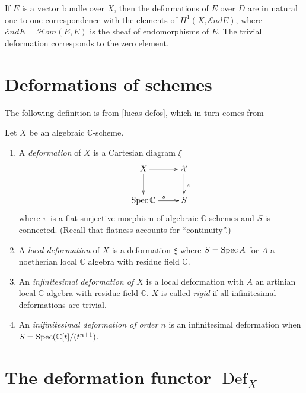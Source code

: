 \begin{lemma}[Corollary]
\label{lemma-vector-bundle-first-order}
If $E$ is a vector bundle over $X$, then the
deformations of $E$ over $D$ are in natural
one-to-one correspondence with the elements
of $H^1(X,\mathcal{E}nd E)$, where
$\mathcal{E}nd E=\mathcal{H}om(E,E)$ is the
sheaf of endomorphisms of $E$. The trivial
deformation corresponds to the zero element.
\end{lemma}



\section{Deformations of schemes}
\label{section-deformations-of-schemes}

\noindent
The following definition is from
[lucas-defos], which in turn comes from
\cite{Sernesi-deformations}

\begin{definition}
\label{definition-deformation}
Let $X$ be an algebraic $\mathbb{C}$-scheme.
\begin{enumerate}
\item A {\it deformation} of $X$ is a
Cartesian diagram $\xi$
$$
\xymatrix{
X\ar[r]\ar[d]&\mathcal{X}\ar[d]^{\pi}\\
\Spec \mathbb{C}\ar[r]^s&S
}
$$
where $\pi$ is a flat surjective morphism of
algebraic $\mathbb{C}$-schemes and
$S$ is connected. (Recall that flatness
accounts for ``continuity''.)
\item A {\it local deformation} of $X$ is a
deformation $\xi$ where
$S=\mathop{\mathrm{Spec}} A$ for $A$ a noetherian local
$\mathbb{C}$ algebra with residue
field $\mathbb{C}$.
\item An {\it infinitesimal deformation of
$X$} is a local deformation with $A$
an artinian local $\mathbb{C}$-algebra with
residue field $\mathbb{C}$. $X$ is
called {\it rigid} if all infinitesimal
deformations are trivial.
\item An {\it inifinitesimal deformation of
order $n$} is an infinitesimal
deformation when $S=\mathop{\mathrm{Spec}}
(\mathbb{C}[t]/(t^{n+1})$.
\end{enumerate}
\end{definition}


\section{The deformation functor
\texorpdfstring
{$\operatorname{Def}_X$}{Def X}}
\label{section-deformation-functor}

